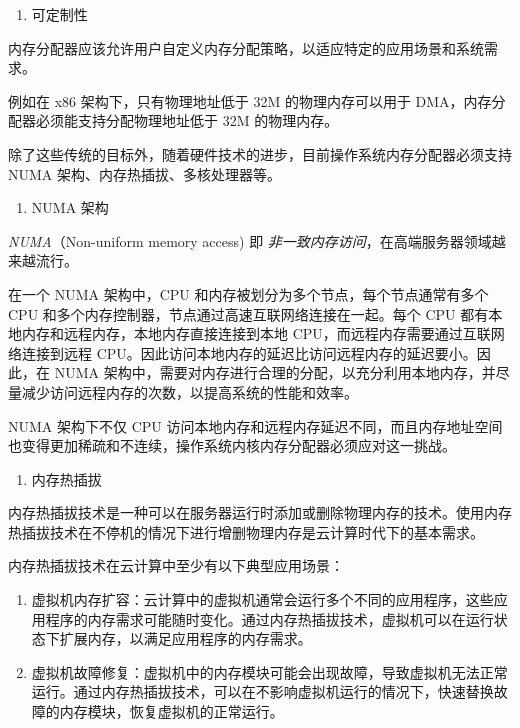 \documentclass[AutoFakeBold]{LZUThesis}
\newcommand{\tightlist}{%
  \setlength{\itemsep}{0pt}\setlength{\parskip}{0pt}}
\begin{document}
\begin{sloppypar}
\begin{enumerate}
\def\labelenumi{\arabic{enumi}.}
\setcounter{enumi}{4}
\tightlist
\item
  可定制性
\end{enumerate}

内存分配器应该允许用户自定义内存分配策略，以适应特定的应用场景和系统需求。

例如在 x86 架构下，只有物理地址低于 32M 的物理内存可以用于
DMA，内存分配器必须能支持分配物理地址低于 32M 的物理内存。

除了这些传统的目标外，随着硬件技术的进步，目前操作系统内存分配器必须支持
NUMA 架构、内存热插拔、多核处理器等。

\begin{enumerate}
\def\labelenumi{\arabic{enumi}.}
\tightlist
\item
  NUMA 架构
\end{enumerate}

\emph{NUMA}（Non-uniform memory access) 即
\emph{非一致内存访问}，在高端服务器领域越来越流行。

在一个 NUMA 架构中，CPU 和内存被划分为多个节点，每个节点通常有多个 CPU
和多个内存控制器，节点通过高速互联网络连接在一起。每个 CPU
都有本地内存和远程内存，本地内存直接连接到本地
CPU，而远程内存需要通过互联网络连接到远程
CPU。因此访问本地内存的延迟比访问远程内存的延迟要小。因此，在 NUMA
架构中，需要对内存进行合理的分配，以充分利用本地内存，并尽量减少访问远程内存的次数，以提高系统的性能和效率。

NUMA 架构下不仅 CPU
访问本地内存和远程内存延迟不同，而且内存地址空间也变得更加稀疏和不连续，操作系统内核内存分配器必须应对这一挑战。

\begin{enumerate}
\def\labelenumi{\arabic{enumi}.}
\setcounter{enumi}{1}
\tightlist
\item
  内存热插拔
\end{enumerate}

内存热插拔技术是一种可以在服务器运行时添加或删除物理内存的技术。使用内存热插拔技术在不停机的情况下进行增删物理内存是云计算时代下的基本需求。

内存热插拔技术在云计算中至少有以下典型应用场景：

\begin{enumerate}
\def\labelenumi{\arabic{enumi}.}
\item
  虚拟机内存扩容：云计算中的虚拟机通常会运行多个不同的应用程序，这些应用程序的内存需求可能随时变化。通过内存热插拔技术，虚拟机可以在运行状态下扩展内存，以满足应用程序的内存需求。
\item
  虚拟机故障修复：虚拟机中的内存模块可能会出现故障，导致虚拟机无法正常运行。通过内存热插拔技术，可以在不影响虚拟机运行的情况下，快速替换故障的内存模块，恢复虚拟机的正常运行。
\end{enumerate}


\end{sloppypar}
\end{document}
